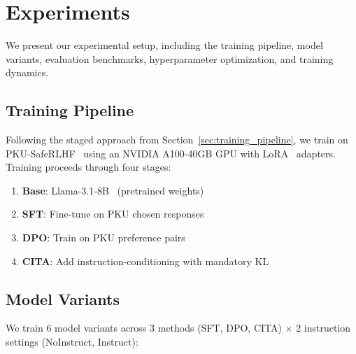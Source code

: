 
\vspace{-2mm}
\section{Experiments}
\label{sec:experiments}

We present our experimental setup, including the training pipeline, model variants, evaluation benchmarks, hyperparameter optimization, and training dynamics.

\vspace{-2mm}
\subsection{Training Pipeline}
\label{sec:training_pipeline_exp}

Following the staged approach from Section~\ref{sec:training_pipeline}, we train on PKU-SafeRLHF~\cite{ji2024pku,bai2022training} using an NVIDIA A100-40GB GPU with LoRA~\cite{hu2022lora} adapters. Training proceeds through four stages:

\begin{enumerate}[leftmargin=*,itemsep=1pt]
    \item \textbf{Base}: Llama-3.1-8B~\cite{dubey2024llama} (pretrained weights)
    \item \textbf{SFT}: Fine-tune on PKU chosen responses
    \item \textbf{DPO}: Train on PKU preference pairs
    \item \textbf{CITA}: Add instruction-conditioning with mandatory KL
\end{enumerate}

\vspace{-2mm}
\subsection{Model Variants}
\label{sec:model_variants}

We train 6 model variants across 3 methods (SFT, DPO, CITA) $\times$ 2 instruction settings (NoInstruct, Instruct):

